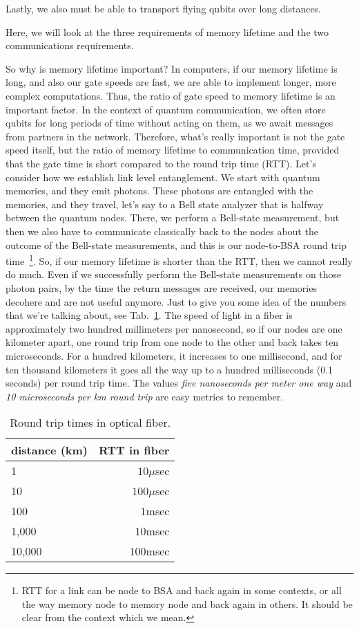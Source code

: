 Lastly, we also must be able to transport flying qubits over long distances.

Here, we will look at the three requirements of memory lifetime and the two communications requirements.

So why is memory lifetime important? In computers, if our memory lifetime is long, and also our gate speeds are fast, we are able to implement longer, more complex computations.  Thus, the ratio of gate speed to memory lifetime is an important factor. In the context of quantum communication, we often store qubits for long periods of time without acting on them, as we await messages from partners in the network.  Therefore, what's really important is not the gate speed itself, but the ratio of memory lifetime to communication time, 
provided that the gate time is short compared to the round trip time (RTT). Let's consider how we establish link level entanglement. We start with quantum memories, and they emit photons. These photons are entangled with the memories, and they travel, let's say to a Bell state analyzer that is halfway between the quantum nodes. There, we perform a Bell-state measurement, but then we also have to communicate classically back to the nodes about the outcome of the Bell-state measurements, and this is our node-to-BSA round trip time~\footnote{RTT for a link can be node to BSA and back again in some contexts, or all the way memory node to memory node and back again in others. It should be clear from the context which we mean.}. So, if our memory lifetime is shorter than the RTT, then we cannot really do much. Even if we successfully perform the Bell-state measurements on those photon pairs, by the time the return messages are received, our memories decohere and are not useful anymore. Just to give you some idea of the numbers that we're talking about, see Tab.~\ref{tab:rtt}. The speed of light in a fiber is approximately two hundred millimeters per nanosecond, so if our nodes are one kilometer apart, one round trip from one node to the other and back takes ten microseconds. For a hundred kilometers, it increases to one millisecond, and for ten thousand kilometers it goes all the way up to a hundred milliseconds (0.1 seconds) per round trip time.  The values \emph{five nanoseconds per meter one way} and \emph{10 microseconds per km round trip} are easy metrics to remember.

\begin{table}
\begin{tabular}{l|r}
distance (km)  & RTT in fiber \\\hline
1     & $10\mu$sec \\
10    & $100\mu$sec \\
100   & $1$msec \\
1,000 & $10$msec \\
10,000 & $100$msec
\end{tabular}
\caption{Round trip times in optical fiber.}
\label{tab:rtt}
\end{table}

